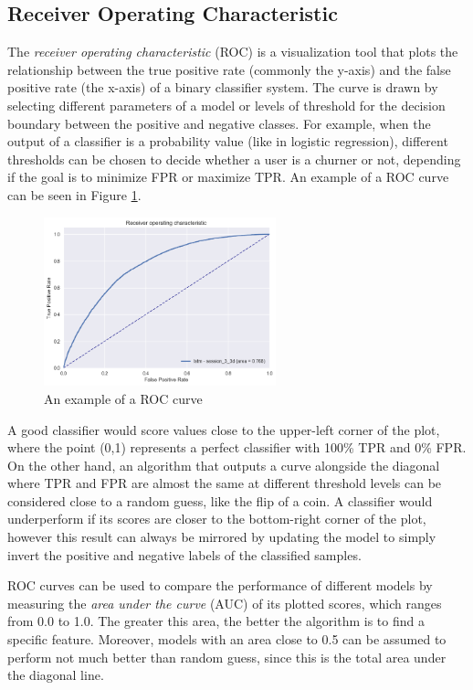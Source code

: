 \documentclass{kththesis}
\begin{document}
\subsection{Receiver Operating Characteristic}

The \emph{receiver operating characteristic} (ROC) is a visualization tool that plots the relationship between the true positive rate (commonly the y-axis) and the false positive rate (the x-axis) of a binary classifier system. The curve is drawn by selecting different parameters of a model or levels of threshold for the decision boundary between the positive and negative classes. For example, when the output of a classifier is a probability value (like in logistic regression), different thresholds can be chosen to decide whether a user is a churner or not, depending if the goal is to minimize FPR or maximize TPR. An example of a ROC curve can be seen in Figure \ref{fig:roc_example}.

\begin{figure}[h]
    \centering
    \includegraphics[width=0.6\textwidth, natwidth=300bp, natheight=200bp]{figures/roc_example.png}
    \caption{An example of a ROC curve}
    \label{fig:roc_example}
\end{figure}

A good classifier would score values close to the upper-left corner of the plot, where the point (0,1) represents a perfect classifier with 100\% TPR and 0\% FPR. On the other hand, an algorithm that outputs a curve alongside the diagonal where TPR and FPR are almost the same at different threshold levels can be considered close to a random guess, like the flip of a coin. A classifier would underperform if its scores are closer to the bottom-right corner of the plot, however this result can always be mirrored by updating the model to simply invert the positive and negative labels of the classified samples.

ROC curves can be used to compare the performance of different models by measuring the \emph{area under the curve} (AUC) of its plotted scores, which ranges from 0.0 to 1.0. The greater this area, the better the algorithm is to find a specific feature. Moreover, models with an area close to 0.5 can be assumed to perform not much better than random guess, since this is the total area under the diagonal line.
\end{document}

